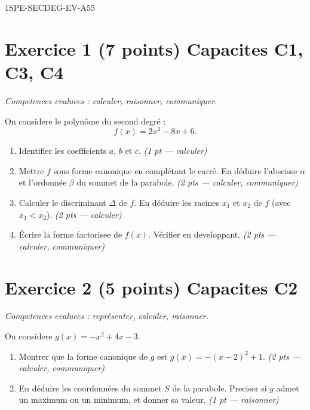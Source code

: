 \begin{evaluation}{1SPE-SECDEG-EV-A}{55}

\section*{Exercice 1 \hfill (7 points) \hfill Capacites C1, C3, C4}

\textit{Competences evaluees : calculer, raisonner, communiquer.}

\medskip
On considere le polynôme du second degré :
\[
  f(x) = 2x^2 - 8x + 6.
\]

\begin{enumerate}
  \item Identifier les coefficients $a$, $b$ et $c$.
  \hfill\textit{(1 pt — calculer)}

  \item Mettre $f$ sous forme canonique en complétant le carré.
  En déduire l'abscisse $\alpha$ et l'ordonnée $\beta$ du sommet de la parabole.
  \hfill\textit{(2 pts — calculer, communiquer)}

  \item Calculer le discriminant $\Delta$ de $f$. En déduire les racines $x_1$ et $x_2$ de $f$ (avec $x_1 < x_2$).
  \hfill\textit{(2 pts — calculer)}

  \item Écrire la forme factorisee de $f(x)$.
  Vérifier en developpant.
  \hfill\textit{(2 pts — calculer, communiquer)}
\end{enumerate}

\section*{Exercice 2 \hfill (5 points) \hfill Capacites C2}

\textit{Competences evaluees : représenter, calculer, raisonner.}

\medskip
On considere $g(x) = -x^2 + 4x - 3$.

\begin{enumerate}
  \item Montrer que la forme canonique de $g$ est $g(x) = -(x-2)^2 + 1$.
  \hfill\textit{(2 pts — calculer, communiquer)}

  \item En déduire les coordonnées du sommet $S$ de la parabole.
  Preciser si $g$ admet un maximum ou un minimum, et donner sa valeur.
  \hfill\textit{(1 pt — raisonner)}


\end{enumerate}
\end{evaluation}
